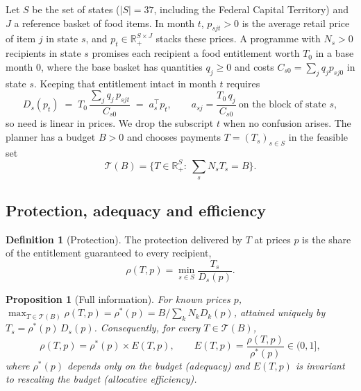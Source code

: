\documentclass[preprint,12pt,number]{elsarticle}%
\newtheorem{proposition}{Proposition}
\theoremstyle{definition}
\newtheorem{definition}{Definition}
\theoremstyle{remark}
\newcommand{\R}{\mathbb{R}}
\begin{document}
Let $S$ be the set of states ($|S|=37$, including the Federal Capital Territory) and $J$ a reference basket of food items. In month $t$, $p_{sjt}>0$ is the average retail price of item $j$ in state $s$, and $p_t\in\R^{S\times J}_{+}$ stacks these prices. A programme with $N_s>0$ recipients in state $s$ promises each recipient a food entitlement worth $T_0$ in a base month $0$, where the base basket has quantities $q_j\ge 0$ and costs $C_{s0}=\sum_j q_j p_{sj0}$ in state $s$. Keeping that entitlement intact in month $t$ requires
\begin{equation}\label{eq:need}
D_{s}(p_t) \;=\; T_0\,\frac{\sum_j q_j\,p_{sjt}}{C_{s0}} \;=\; a_s^{\top}p_t,
\qquad a_{sj}=\frac{T_0\,q_j}{C_{s0}}\ \text{on the block of state } s,
\end{equation}
so need is linear in prices. We drop the subscript $t$ when no confusion arises. The planner has a budget $B>0$ and chooses payments $T=(T_s)_{s\in S}$ in the feasible set
\begin{equation}\label{eq:feasible}
\mathcal{T}(B)=\Big\{T\in\R^{S}_{+}:\ \textstyle\sum_{s}N_sT_s=B\Big\}.
\end{equation}

\subsection{Protection, adequacy and efficiency}

\begin{definition}[Protection]
The protection delivered by $T$ at prices $p$ is the share of the entitlement guaranteed to every recipient,
\begin{equation}\label{eq:protection}
\rho(T,p)=\min_{s\in S}\frac{T_s}{D_s(p)}.
\end{equation}
\end{definition}

\begin{proposition}[Full information]\label{prop:fullinfo}
For known prices $p$, $\max_{T\in\mathcal T(B)}\rho(T,p)=\rho^*(p)=B/\sum_{k}N_kD_k(p)$, attained uniquely by $T_s=\rho^*(p)\,D_s(p)$. Consequently, for every $T\in\mathcal T(B)$,
\begin{equation}\label{eq:decomp}
\rho(T,p)=\rho^*(p)\times E(T,p),\qquad E(T,p)=\frac{\rho(T,p)}{\rho^*(p)}\in(0,1],
\end{equation}
where $\rho^*(p)$ depends only on the budget (\emph{adequacy}) and $E(T,p)$ is invariant to rescaling the budget (\emph{allocative efficiency}).
\end{proposition}
\end{document}
